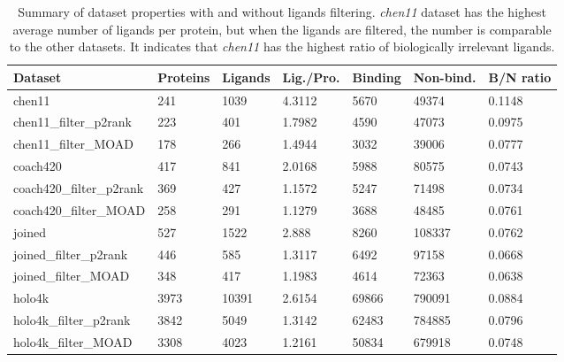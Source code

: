 \begin{table}[]
\footnotesize
\begin{tabular}{@{}lllllll@{}}
\toprule
Dataset                  & Proteins & Ligands & Lig./Pro. & Binding & Non-bind. & B/N ratio \\ \midrule
chen11                   & 241      & 1039    & 4.3112        & 5670         & 49374            & 0.1148    \\
chen11\_filter\_p2rank   & 223      & 401     & 1.7982        & 4590         & 47073            & 0.0975    \\
chen11\_filter\_MOAD     & 178      & 266     & 1.4944        & 3032         & 39006            & 0.0777    \\
coach420                 & 417      & 841     & 2.0168        & 5988         & 80575            & 0.0743    \\
coach420\_filter\_p2rank & 369      & 427     & 1.1572        & 5247         & 71498            & 0.0734    \\
coach420\_filter\_MOAD   & 258      & 291     & 1.1279        & 3688         & 48485            & 0.0761    \\
joined                   & 527      & 1522    & 2.888         & 8260         & 108337           & 0.0762    \\
joined\_filter\_p2rank   & 446      & 585     & 1.3117        & 6492         & 97158            & 0.0668    \\
joined\_filter\_MOAD     & 348      & 417     & 1.1983        & 4614         & 72363            & 0.0638    \\
holo4k                   & 3973     & 10391   & 2.6154        & 69866        & 790091           & 0.0884    \\
holo4k\_filter\_p2rank   & 3842     & 5049    & 1.3142        & 62483        & 784885           & 0.0796    \\
holo4k\_filter\_MOAD     & 3308     & 4023    & 1.2161        & 50834        & 679918           & 0.0748    \\ \bottomrule
\end{tabular}
\caption{Summary of dataset properties with and without ligands filtering. \textit{chen11} dataset has the highest average number of ligands per protein, but when the ligands are filtered, the number is comparable to the other datasets. It indicates that \textit{chen11} has the highest ratio of biologically irrelevant ligands.}
\label{tab:datasets}
\end{table}

